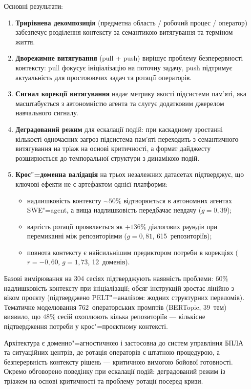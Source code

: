 \documentclass[11pt]{article}
\begin{document}
Основні результати:
\begin{enumerate}[nosep]
  \item \textbf{Трирівнева декомпозиція} (предметна область / робочий процес / оператор) забезпечує розділення контексту за семантикою витягування та терміном життя.
  \item \textbf{Дворежимне витягування} (pull + push) вирішує проблему безперервності контексту: pull фокусує ініціалізацію на поточну задачу, push підтримує актуальність для простоюючих задач та ротації операторів.
  \item \textbf{Сигнал корекції витягування} надає метрику якості підсистеми пам'яті, яка масштабується з автономністю агента та слугує додатковим джерелом навчального сигналу.
  \item \textbf{Деградований режим} для ескалації подій: при каскадному зростанні кількості одночасних загроз підсистема пам'яті переходить з семантичного витягування на тріаж на основі критичності, а формат дайджесту розширюється до темпоральної структури з динамікою подій.
  \item \textbf{Крос"=доменна валідація} на трьох незалежних датасетах підтверджує, що ключові ефекти не є артефактом однієї платформи:
  \begin{itemize}[nosep]
    \item надлишковість контексту ${\sim}50\%$ відтворюється в автономних агентах SWE"=agent, а вища надлишковість передбачає невдачу ($g{=}0{,}39$);
    \item вартість ротації проявляється як $+136\%$ діалогових раундів при перемиканні між репозиторіями ($g{=}0{,}81$, 615~репозиторіїв);
    \item повнота контексту є найсильнішим предиктором потреби в корекціях ($r{=}{-}0{,}60$, $g{=}1{,}73$, 12~доменів).
  \end{itemize}
\end{enumerate}

Базові вимірювання на 304 сесіях підтверджують наявність проблеми: 60\% надлишковість контексту при ініціалізації; обсяг інструкцій зростає лінійно з віком проєкту (підтверджено PELT"=аналізом: жодних структурних переломів).
Тематичне моделювання 762~операторських промптів (BERTopic, 39~тем) виявило, що 48\% сесій охоплюють кілька репозиторіїв --- кількісне підтвердження потреби у крос"=проєктному контексті.

Архітектура є доменно"=агностичною і застосовна до систем управління БПЛА та ситуаційних центрів, де ротація операторів є штатною процедурою, а безперервність контексту рішень --- критичною вимогою бойової готовності.
Окремо обговорено поведінку при ескалації подій: деградований режим із тріажем на основі критичності та проблему ротації посеред кризи.
\end{document}
